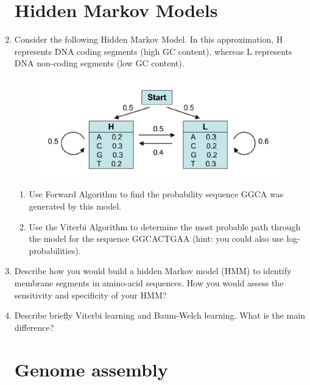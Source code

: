 \documentclass[11pt,runningheads,a4paper]{article}
\begin{document}
\begin{enumerate}

\section*{Hidden Markov Models}
\label{sec:hidden_markov_models}

  \item Consider the following Hidden Markov Model. In this approximation, H represents DNA coding segments (high GC content), whereas L represents DNA non-coding segments (low GC content).
    \begin{figure}[H]
      \centering
      \includegraphics[scale=0.35]{img/Bioinformatics_Problem_Sheet3_Figure1.png}
    \end{figure}
  \begin{enumerate}
  \item Use Forward Algorithm to find the probability sequence GGCA was generated by this model.
  \item Use the Viterbi Algorithm to determine the most probable path through the model for the sequence GGCACTGAA (hint: you could also use log-probabilities).
  \end{enumerate}
  \item Describe how you would build a hidden Markov model (HMM) to identify membrane segments in amino-acid sequences\@. 
    How you would assess the sensitivity and specificity of your HMM?
  \item Describe briefly Viterbi learning and Baum-Welch learning. What is the main difference?
    
\section*{Genome assembly}
\label{sec:genome_assembly}



\end{enumerate}
\end{document}
